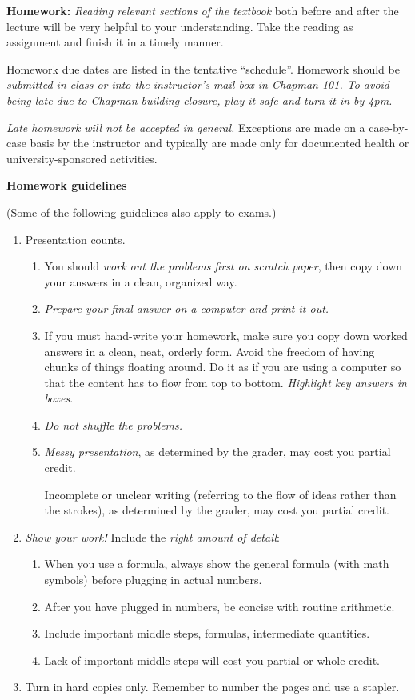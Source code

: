 \documentclass{article}
\begin{document}
\bigskip
\textbf{\large Homework:}
\emph{Reading relevant sections of the textbook} both before and after
the lecture will be very helpful to your understanding.
Take the reading as assignment and finish it in a timely manner.

Homework due dates are listed in the tentative ``schedule''.
Homework should be \emph{submitted in class or into the
instructor's mail box in Chapman 101.
To avoid being late due to Chapman building closure,
play it safe and turn it in by 4pm.}

\emph{Late homework will not be accepted in general.}
Exceptions are made
on a case-by-case basis by the instructor and typically are made only for
documented health or university-sponsored activities.

\textbf{Homework guidelines}

(Some of the following guidelines also apply to exams.)

\begin{enumerate}
\item Presentation counts.
    \begin{enumerate}
    \item You should \emph{work out the problems first on scratch paper},
        then copy down your answers in a clean, organized way.
    \item \emph{Prepare your final answer on a computer and print it
        out.}
    \item If you must hand-write your homework, make sure you copy down
        worked answers in a clean, neat, orderly form.
        Avoid the freedom of having chunks of things floating around.
        Do it as if you are using a computer so that the content has to
        flow from top to bottom.
        \emph{Highlight key answers in boxes}.
    \item \emph{Do not shuffle the problems.}
    \item \emph{Messy presentation}, as determined by the grader, may cost you
        partial credit.

        Incomplete or unclear writing (referring to the flow of ideas
        rather than the strokes),
        as determined by the grader, may cost you partial credit.
    \end{enumerate}
\item \emph{Show your work!} Include the \emph{right amount of detail}:
    \begin{enumerate}
    \item When you use a formula, always show the general formula (with
        math symbols) before plugging in actual numbers.
    \item After you have plugged in numbers, be concise with routine arithmetic.
    \item Include important middle steps, formulas, intermediate
        quantities.
    \item Lack of important middle steps will cost you partial or whole
        credit.
    \end{enumerate}
\item Turn in hard copies only. Remember to number the pages and use a stapler.
\end{enumerate}
\end{document}

